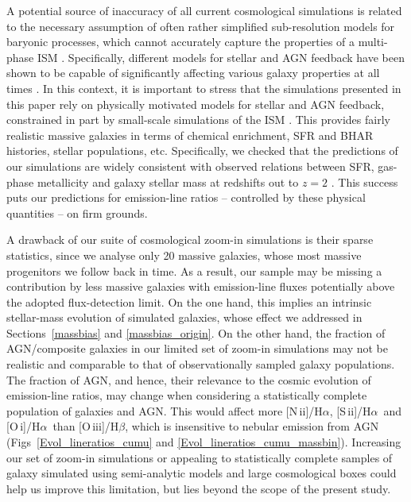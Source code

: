 \documentclass[fleqn,usenatbib]{mnras}
\newcommand{\oiiihb}{\hbox{[O\,{\sc iii}]/H$\beta$}}
\newcommand{\niiha}{\hbox{[N\,{\sc ii}]/H$\alpha$}}
\newcommand{\siiha}{\hbox{[S\,{\sc ii}]/H$\alpha$}}
\newcommand{\oiha}{\hbox{[O\,{\sc i}]/H$\alpha$}}
\begin{document}
A potential source of inaccuracy of all current cosmological
simulations is related to the necessary assumption of often rather
simplified sub-resolution models for baryonic
processes, which cannot accurately capture the properties of a
  multi-phase ISM \citep[see, e.g.,][]{Naab16}. Specifically, different
models for stellar \citep[e.g.,][]{Guedes11, Stinson13, Hirschmann13,
  Hirschmann16, Hopkins13} and AGN feedback
\citep[e.g.,][]{Dubois13, Steinborn15, Steinborn16, Choi16,
  Weinberger17} have been shown to be capable of
significantly affecting various galaxy properties at all times
. In this context, it is important to
stress that the  simulations presented in this paper rely on
physically motivated models for  stellar and AGN feedback, constrained
in part by small-scale simulations of the  ISM \citep[see
Section~\ref{simulations} above and][Hirschmann et al., in
preparation]{Choi16}. This provides fairly realistic massive  galaxies
in terms of chemical enrichment, SFR and BHAR histories, stellar
populations, etc. Specifically, we checked that the predictions of 
our simulations are widely consistent with observed relations
between SFR, gas-phase metallicity and galaxy stellar mass at redshifts
out to $z=2$ \citep[using observational constraints
from][]{Maiolino08, Maier15, Andrews12, Daddi07, Elbaz07}. This
success puts our predictions for emission-line   ratios -- controlled
by these physical quantities -- on firm grounds. 

A drawback of our suite of cosmological zoom-in simulations is
their sparse statistics,  since we analyse only 20 massive galaxies,
whose most massive progenitors we follow back in time. As a
result, our sample may be missing a contribution by less massive galaxies
with emission-line fluxes potentially above the adopted flux-detection limit.
On the one hand, this implies an intrinsic stellar-mass evolution of  simulated
galaxies, whose effect we addressed in Sections~\ref{massbias} and
\ref{massbias_origin}. On the other hand, the fraction of
AGN/composite galaxies in our limited set of zoom-in simulations may 
not be realistic and comparable to that of observationally sampled
galaxy populations. The fraction of AGN,  and hence, their relevance
to the cosmic evolution of emission-line ratios, may change when
considering a statistically complete population of galaxies and
AGN. This would affect more \niiha, \siiha\ and \oiha\ than \oiiihb,
which is insensitive to nebular emission  from AGN
(Figs~\ref{Evol_lineratios_cumu} and
\ref{Evol_lineratios_cumu_massbin}). Increasing our set of zoom-in
simulations or appealing to statistically complete samples of galaxy
simulated using semi-analytic models and large cosmological boxes
could help us improve this limitation, but lies beyond the scope of
the present study.  
\end{document}
